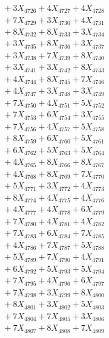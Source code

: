 \documentclass[a4paper,10pt]{article}
\begin{document}
{\begin{align}
&\;  + 3 X_{4726} + 4 X_{4727} + 4 X_{4728} \\[0.3ex]
&\;  + 7 X_{4729} + 3 X_{4730} + 4 X_{4731} \\[0.3ex]
&\;  + 8 X_{4732} + 8 X_{4733} + 3 X_{4734} \\[0.3ex]
&\;  + 3 X_{4735} + 8 X_{4736} + 3 X_{4737} \\[0.3ex]
&\;  + 3 X_{4738} + 7 X_{4739} + 8 X_{4740} \\[0.3ex]
&\;  + 3 X_{4741} + 3 X_{4742} + 8 X_{4743} \\[0.3ex]
&\;  + 4 X_{4744} + 8 X_{4745} + 7 X_{4746} \\[0.3ex]
&\;  + 4 X_{4747} + 3 X_{4748} + 3 X_{4749} \\[0.5ex]\allowbreak
&\;  + 7 X_{4750} + 4 X_{4751} + 5 X_{4752} \\[0.3ex]
&\;  + 7 X_{4753} + 6 X_{4754} + 3 X_{4755} \\[0.3ex]
&\;  + 7 X_{4756} + 4 X_{4757} + 5 X_{4758} \\[0.3ex]
&\;  + 8 X_{4759} + 6 X_{4760} + 5 X_{4761} \\[0.3ex]
&\;  + 6 X_{4762} + 5 X_{4763} + 5 X_{4764} \\[0.3ex]
&\;  + 4 X_{4765} + 8 X_{4766} + 8 X_{4767} \\[0.3ex]
&\;  + 4 X_{4768} + 8 X_{4769} + 7 X_{4770} \\[0.3ex]
&\;  + 5 X_{4771} + 3 X_{4772} + 4 X_{4773} \\[0.3ex]
&\;  + 8 X_{4774} + 4 X_{4775} + 4 X_{4776} \\[0.3ex]
&\;  + 4 X_{4777} + 4 X_{4778} + 6 X_{4779} \\[0.5ex]\allowbreak
&\;  + 7 X_{4780} + 4 X_{4781} + 4 X_{4782} \\[0.3ex]
&\;  + 7 X_{4783} + 6 X_{4784} + 7 X_{4785} \\[0.3ex]
&\;  + 4 X_{4786} + 7 X_{4787} + 5 X_{4788} \\[0.3ex]
&\;  + 5 X_{4789} + 7 X_{4790} + 4 X_{4791} \\[0.3ex]
&\;  + 6 X_{4792} + 5 X_{4793} + 5 X_{4794} \\[0.3ex]
&\;  + 7 X_{4795} + 4 X_{4796} + 6 X_{4797} \\[0.3ex]
&\;  + 7 X_{4798} + 3 X_{4799} + 8 X_{4800} \\[0.3ex]
&\;  + 8 X_{4801} + 3 X_{4802} + 5 X_{4803} \\[0.3ex]
&\;  + 7 X_{4804} + 7 X_{4805} + 3 X_{4806} \\[0.3ex]
&\;  + 7 X_{4807} + 8 X_{4808} + 7 X_{4809} \\[0.5ex]\allowbreak

\end{align}}
\end{document}
